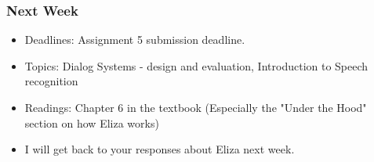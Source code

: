 \documentclass{beamer}
\begin{document}
\begin{frame}
\frametitle{Next Week}
\begin{itemize}
\item Deadlines: Assignment 5 submission deadline.
\item Topics: Dialog Systems - design and evaluation, Introduction to Speech recognition
\item Readings: Chapter 6 in the textbook (Especially the "Under the Hood" section on how Eliza works)
\item I will get back to your responses about Eliza next week.
\end{itemize}
\end{frame}
\end{document}
